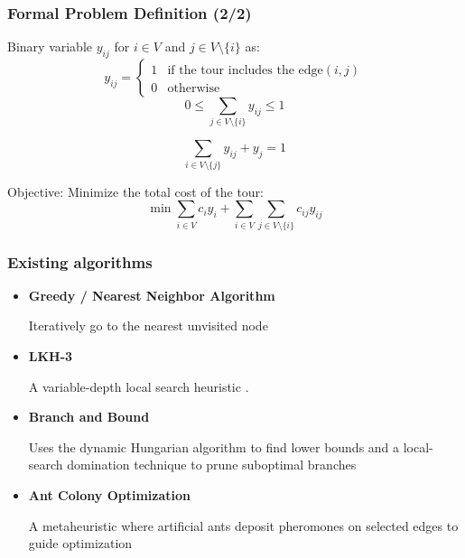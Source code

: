 \documentclass{beamer}
\begin{document}
\begin{frame}
    \frametitle{Formal Problem Definition (2/2)}
    
    Binary variable \( y_{ij} \) for \( i \in V \) and \( j \in V \setminus \{i\} \) as:
    \[
    y_{ij} = 
    \begin{cases} 
    1 & \text{if the tour includes the edge} (i,j) \\ 
    0 & \text{otherwise}
    \end{cases}
    \]
    \[
        0 \leq \sum_{j \in V \setminus \{i\}}  y_{ij} \leq 1
    \]
    
    \[
    \sum_{i \in V \setminus \{j\}} y_{ij} + y_j = 1
    \]
    
    Objective: Minimize the total cost of the tour:
    \[
    \min  \sum_ {i \in V} c_i y_i + \sum_ {i \in V} \sum_{j \in V \setminus \{i\}} c_{ij} y_{ij}
    \]
\end{frame}



\begin{frame}
\frametitle{Existing algorithms}

\begin{itemize}
\item \textbf{Greedy / Nearest Neighbor Algorithm}

Iteratively go to the nearest unvisited node \cite{atsp}
\item \textbf{LKH-3} 

A variable-depth local search heuristic \cite{lkh3}.
\item \textbf{Branch and Bound}

Uses the dynamic Hungarian algorithm to find lower bounds and a local-search domination technique to prune suboptimal branches
\cite{branch_bound_sop}

\item \textbf{Ant Colony Optimization}

A metaheuristic where artificial ants deposit pheromones on selected edges to guide optimization  \cite{antcolony}
\end{itemize}
\end{frame}
\end{document}
